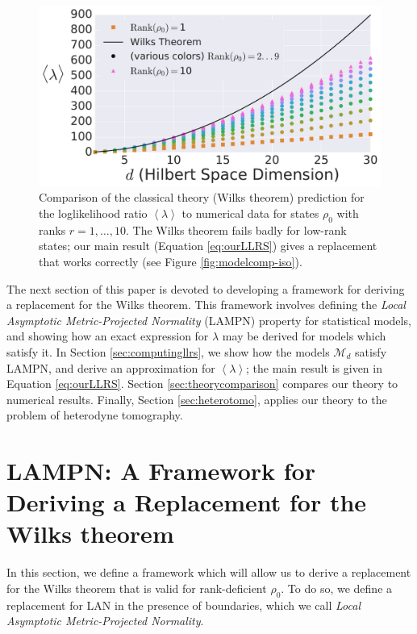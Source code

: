 \documentclass[aps,pra, twocolumn]{revtex4-1}
\newcommand{\M}{\mathcal{M}}
\newcommand{\expect}[1]{\ensuremath{\left\langle#1\right\rangle}}
\begin{document}
\begin{figure}
\includegraphics[width=\columnwidth]{Images/Figure_2A.pdf}
 \caption{Comparison of the classical theory (Wilks theorem) prediction for the loglikelihood ratio $\expect{\lambda}$ to numerical data for states $\rho_{0}$ with ranks $r=1,\ldots ,10$.  The Wilks theorem fails badly for low-rank states; our main result (Equation \ref{eq:ourLLRS}) gives a replacement that works correctly (see Figure \ref{fig:modelcomp-iso}).}
\label{fig:boundaries2}
\end{figure}

The next section of this paper is devoted to developing a framework for deriving a replacement for the Wilks theorem. This framework involves defining the \emph{Local Asymptotic Metric-Projected Normality} (LAMPN) property for statistical models, and showing how an exact expression for $\lambda$ may be derived for models which satisfy it. In Section \ref{sec:computingllrs}, we show how the models $\M_{d}$ satisfy LAMPN, and derive an approximation for $\expect{\lambda}$; the main result is given in Equation \eqref{eq:ourLLRS}.  Section \ref{sec:theorycomparison} compares our theory to numerical results. Finally, Section \ref{sec:heterotomo}, applies our theory to the problem of heterodyne tomography.

\section{LAMPN: A Framework for Deriving a Replacement for the Wilks theorem}
\label{sec:wilksreplacement}

In this section, we define a framework which will allow us to derive a replacement for the Wilks theorem that is valid for rank-deficient $\rho_{0}$. To do so, we define a replacement for LAN in the presence of boundaries, which we call \emph{Local Asymptotic Metric-Projected Normality}.
\end{document}
